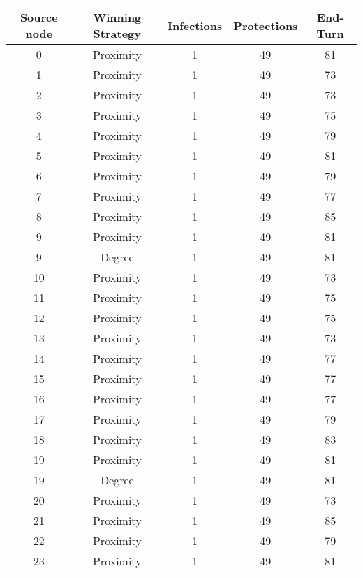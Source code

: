 \documentclass[results.tex]{subfiles}
\begin{document}
\begin{center}
  \begin{tabular}{| c || c | c | c | c |}
    \hline
    {\bfseries Source node} & {\bfseries Winning Strategy} & {\bfseries Infections} & {\bfseries Protections} & {\bfseries End-Turn} \\  %
    \hline\hline
    0 & Proximity & 1 & 49 & 81 \\ 
    \hline
    1 & Proximity & 1 & 49 & 73 \\ 
    \hline
    2 & Proximity & 1 & 49 & 73 \\ 
    \hline
    3 & Proximity & 1 & 49 & 75 \\ 
    \hline
    4 & Proximity & 1 & 49 & 79 \\ 
    \hline
    5 & Proximity & 1 & 49 & 81 \\ 
    \hline
    6 & Proximity & 1 & 49 & 79 \\ 
    \hline
    7 & Proximity & 1 & 49 & 77 \\ 
    \hline
    8 & Proximity & 1 & 49 & 85 \\ 
    \hline
    9 & Proximity & 1 & 49 & 81 \\ 
    \hline
    9 & Degree & 1 & 49 & 81 \\ 
    \hline
    10 & Proximity & 1 & 49 & 73 \\ 
    \hline
    11 & Proximity & 1 & 49 & 75 \\ 
    \hline
    12 & Proximity & 1 & 49 & 75 \\ 
    \hline
    13 & Proximity & 1 & 49 & 73 \\ 
    \hline
    14 & Proximity & 1 & 49 & 77 \\ 
    \hline
    15 & Proximity & 1 & 49 & 77 \\ 
    \hline
    16 & Proximity & 1 & 49 & 77 \\ 
    \hline
    17 & Proximity & 1 & 49 & 79 \\ 
    \hline
    18 & Proximity & 1 & 49 & 83 \\ 
    \hline
    19 & Proximity & 1 & 49 & 81 \\ 
    \hline
    19 & Degree & 1 & 49 & 81 \\ 
    \hline
    20 & Proximity & 1 & 49 & 73 \\ 
    \hline
    21 & Proximity & 1 & 49 & 85 \\ 
    \hline
    22 & Proximity & 1 & 49 & 79 \\ 
    \hline
    23 & Proximity & 1 & 49 & 81 \\ 

\end{tabular}
\end{center}
\end{document}
